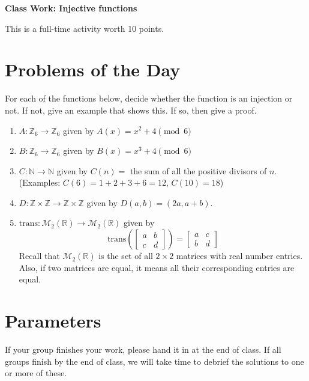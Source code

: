 \documentclass[11pt]{article}
\begin{document}
	
	\thispagestyle{empty}
	\renewcommand{\headrulewidth}{0.0pt}
	\thispagestyle{fancy}
	\lfoot{}
	\cfoot{}
	\rfoot{}	
	
	\vspace*{0in}

		\begin{center}
			\begin{large}
			\textbf{Class Work: Injective functions} \\
			\end{large}
			This is a full-time activity worth 10 points. 
			
		\end{center}
		

\section*{Problems of the Day}

For each of the functions below, decide whether the function is an injection or not. If not, give an example that shows this. If so, then give a proof. 

\begin{enumerate}
	
	\item $A: \mathbb{Z}_6 \rightarrow \mathbb{Z}_6$ given by $A(x) = x^2 + 4 \pmod 6$
	\item $B: \mathbb{Z}_6 \rightarrow \mathbb{Z}_6$ given by $B(x) = x^3 + 4 \pmod 6$
	\item $C: \mathbb{N} \rightarrow \mathbb{N}$ given by $C(n) = $ the sum of all the positive divisors of $n$. (Examples: $C(6) = 1 + 2 + 3 + 6 = 12$, $C(10)=18$)
	\item $D: \mathbb{Z} \times \mathbb{Z} \rightarrow \mathbb{Z} \times \mathbb{Z} $ given by $D(a,b) = (2a, a + b)$.
 	\item $\text{trans}: \mathcal{M}_2(\mathbb{R}) \rightarrow \mathcal{M}_2(\mathbb{R})$ given by 
	\[ \text{trans}\left( 
	\begin{bmatrix*}
		a & b \\ c & d 
	\end{bmatrix*} \right) = 
	\begin{bmatrix*}
		a & c \\ b & d 
	\end{bmatrix*} \]
	Recall that $\mathcal{M}_2(\mathbb{R})$ is the set of all $2 \times 2$ matrices with real number entries. Also, if two matrices are equal, it means all their corresponding entries are equal. 

\end{enumerate}

\section*{Parameters}

If your group finishes your work, please hand it in at the end of class. If all groups finish by the end of class, we will take time to debrief the solutions to one or more of these. 
\end{document}
